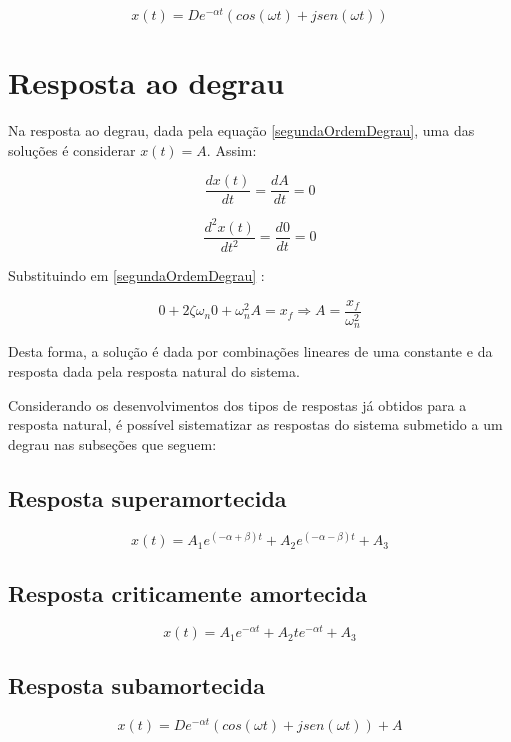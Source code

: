 \documentclass[12pt,fleqn]{book} %
\begin{document}
{\begin{equation}
x(t) = De^{-\alpha t}( cos(\omega t) + jsen(\omega t))
\end{equation}

\section{Resposta ao degrau}

Na resposta ao degrau, dada pela equação \ref{segundaOrdemDegrau}, uma das soluções é considerar $x(t) = A$. Assim:

\begin{equation}
\frac{dx(t)}{dt} = \frac{dA}{dt} = 0
\end{equation}

\begin{equation}
\frac{d^2x(t)}{dt^2} = \frac{d0}{dt} = 0
\end{equation}

Substituindo em \ref{segundaOrdemDegrau} :

\begin{equation}
0 + 2\zeta\omega_n0 + \omega_n^2A = x_f \Rightarrow A = \frac{x_f}{\omega_n^2}
\end{equation}

Desta forma, a solução é dada por combinações lineares de uma constante e da resposta dada pela resposta natural do sistema.

Considerando os desenvolvimentos dos tipos de respostas já obtidos para a resposta natural, é possível sistematizar as respostas do sistema submetido a um degrau nas subseções que seguem:

\subsection{Resposta superamortecida}
\begin{equation}
x(t) = A_1e^{(-\alpha + \beta)t} + A_2e^{(-\alpha - \beta)t} + A_3
\end{equation}

\subsection{Resposta criticamente amortecida}
\begin{equation}
x(t) = A_1e^{-\alpha t} + A_2te^{-\alpha t} + A_3
\end{equation}

\subsection{Resposta subamortecida}
\begin{equation}
x(t) = De^{-\alpha t}( cos(\omega t) + jsen(\omega t)) + A
\end{equation}

}
\end{document}
